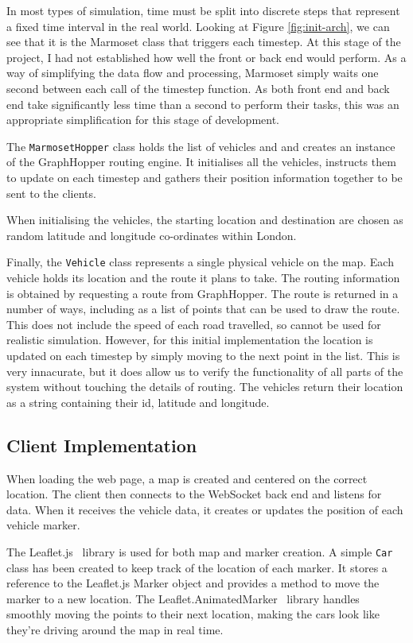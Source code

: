 \documentclass[ %
                    author={Alexander Hill},
                supervisor={Dr. Benjamin Sach},
                    degree={MEng},
                     title={MARMOSET: Multi Agent Real-time Multi-core Online
                     Simulation for Efficient Transportation},
                  subtitle={},
                      type={research},
                      year={2016} ]{dissertation}
\begin{document}
In most types of simulation, time must be split into discrete steps that
represent a fixed time interval in the real world. Looking at Figure
\ref{fig:init-arch}, we can see that it is the Marmoset class that triggers each
timestep. At this stage of the project, I had not established how well the front
or back end would perform. As a way of simplifying the data flow and processing,
Marmoset simply waits one second between each call of the timestep function.
As both front end and back end take significantly less time than a second to
perform their tasks, this was an appropriate simplification for this stage
of development.

The \texttt{MarmosetHopper} class holds the list of vehicles and and creates an instance
of the GraphHopper routing engine. It initialises all the vehicles, instructs
them to update on each timestep and gathers their position information together
to be sent to the clients.

When initialising the vehicles, the starting location and destination are chosen
as random latitude and longitude co-ordinates within London.

Finally, the \texttt{Vehicle} class represents a single physical vehicle on the
map. Each vehicle holds its location and the route it plans to take. The routing
information is obtained by requesting a route from GraphHopper. The route is
returned in a number of ways, including as a list of points that can be used to
draw the route. This does not include the speed of each road travelled, so
cannot be used for realistic simulation. However, for this initial
implementation the location is updated on each timestep by simply moving to the
next point in the list. This is very innacurate, but it does allow us to verify
the functionality of all parts of the system without touching the details of
routing. The vehicles return their location as a string containing their id,
latitude and longitude.

\subsection{Client Implementation}

When loading the web page, a map is created and centered on the correct location.
The client then connects to the WebSocket back end and listens for data. When it
receives the vehicle data, it creates or updates the position of each vehicle marker.

The Leaflet.js~\cite{leaflet} library is used for both map and marker creation.
A simple \texttt{Car} class has been created to keep track of the location of each
marker. It stores a reference to the Leaflet.js Marker object and provides a method to
move the marker to a new location. The Leaflet.AnimatedMarker~\cite{animarker}
library handles smoothly moving the points to their next location, making the
cars look like they're driving around the map in real time.
\end{document}
